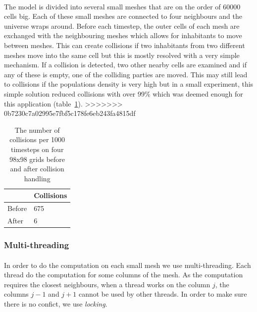 \documentclass{report}
\begin{document}
\paragraph{}
The model is divided into several small meshes that are on the order of 60000 cells big. Each of these small meshes are connected to four neighbours and the universe wraps around. Before each timestep, the outer cells of each mesh are exchanged with the neighbouring meshes which allows for inhabitants to move between meshes. This can create collisions if two inhabitants from two different meshes move into the same cell but this is mostly resolved with a very simple mechanism. If a collision is detected, two other nearby cells are examined and if any of these is empty, one of the colliding parties are moved. This may still lead to collisions if the populations density is very high but in a small experiment, this simple solution reduced collisions with over 99\% which was deemed enough for this application (table~\ref{collisions}).
>>>>>>> 0b7230c7a02995e7fbf5c178fe6eb243fa4815df

\begin{table}[h!]
\centering
\begin{tabular}{|l|l|}
\hline
& Collisions\\
\hline
Before & 675\\
\hline
After & 6\\
\hline
\end{tabular}
\caption{The number of collisions per 1000 timesteps on four 98x98 grids before and after collision handling}
\label{collisions}
\end{table}

\subsubsection{Multi-threading}

\paragraph{}
In order to do the computation on each small mesh we use multi-threading. Each thread do the computation for some columns of the mesh. As the computation requires the closest neighbours, when a thread works on the column $j$, the columns $j-1$ and $j+1$ cannot be used by other threads. In order to make sure there is no confict, we use \emph{locking}.
\end{document}
